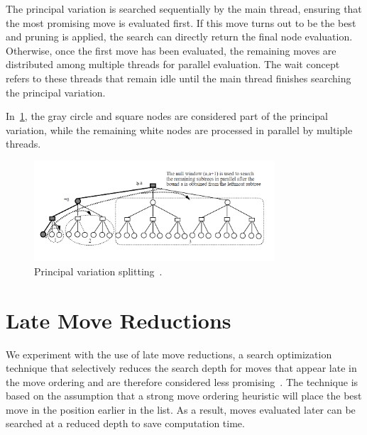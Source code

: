 \vspace{1em}

\noindent The principal variation is searched sequentially by the main thread, ensuring that the most promising move is evaluated first. If this move turns out to be the best and pruning is applied, the search can directly return the final node evaluation. Otherwise, once the first move has been evaluated, the remaining moves are distributed among multiple threads for parallel evaluation. The wait concept refers to these threads that remain idle until the main thread finishes searching the principal variation.

\vspace{1em}

\noindent In~\cref{fig:pvsplitting}, the gray circle and square nodes are considered part of the principal variation, while the remaining white nodes are processed in parallel by multiple threads.

\begin{figure}
   \centering
   \includegraphics[width=0.8\textwidth]{Imagenes/Bitmap/pvsplitting.png}
   \caption{Principal variation splitting~\cite{PVSplitting}.}\label{fig:pvsplitting}
\end{figure}

\newpage
\section{Late Move Reductions}

\noindent We experiment with the use of late move reductions, a search optimization technique that selectively reduces the search depth for moves that appear late in the move ordering and are therefore considered less promising~\cite{LateMoveReductions}. The technique is based on the assumption that a strong move ordering heuristic will place the best move in the position earlier in the list. As a result, moves evaluated later can be searched at a reduced depth to save computation time.

\vspace{1em}

